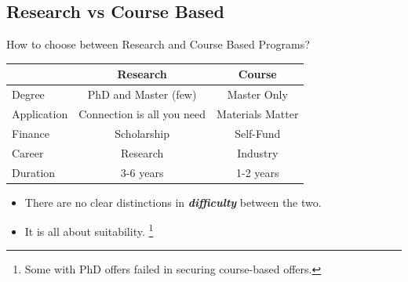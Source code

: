 \documentclass[UTF8]{beamer}
\begin{document}
\subsection{Research vs Course Based}
\begin{frame}{How to choose between Research and Course Based Programs?}
  \begin{table}[h]
    \centering
    \begin{tabular}{l|c|c}

      \toprule
      & Research& Course\\
      \midrule
      Degree & PhD and Master (\small{few}) & Master Only \\
      Application & Connection is all you need &  Materials Matter \\
      Finance & Scholarship & Self-Fund \\
      Career & Research & Industry \\
      Duration & 3-6 years & 1-2 years \\

      \bottomrule
    \end{tabular}
  \end{table}

  \begin{itemize}
    \item There are no clear distinctions in \textbf{\textit{difficulty}} between the two.
    \item It is all about suitability. \footnote{Some with PhD offers failed in securing course-based offers.}
  \end{itemize}
\end{frame}

%
\end{document}

